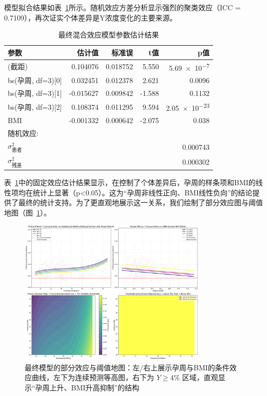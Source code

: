 \documentclass[withoutpreface]{cumcmthesis}
\begin{document}
模型拟合结果如表~\ref{tab:params}所示。随机效应方差分析显示强烈的聚类效应（ICC = \num{0.7109}），再次证实个体差异是Y浓度变化的主要来源。

\begin{table}[htbp]
  \centering
  \caption{最终混合效应模型参数估计结果}
  \label{tab:params}
  \begin{tabular}{@{}lrrrr@{}}
    \toprule
    参数 & 估计值 & 标准误 & t值 & p值 \\
    \midrule
    (截距) & 0.104076 & 0.018752 & 5.550 & \num{5.69e-7} \\
    bs(孕周, df=3)[0] & 0.032451 & 0.012378 & 2.621 & 0.0096 \\
    bs(孕周, df=3)[1] & -0.015627 & 0.009842 & -1.588 & 0.1132 \\
    bs(孕周, df=3)[2] & 0.108374 & 0.011295 & 9.594 & \num{2.05e-23} \\
    BMI & -0.001332 & 0.000642 & -2.075 & 0.038 \\
    \midrule
    \multicolumn{5}{l}{随机效应:}\\
    $\sigma^2_{\text{患者}}$ & \multicolumn{4}{r}{0.000743}\\
    $\sigma^2_{\text{残差}}$ & \multicolumn{4}{r}{0.000302}\\
    \bottomrule
  \end{tabular}
\end{table}

表~\ref{tab:params}中的固定效应估计结果显示，在控制了个体差异后，孕周的样条项和BMI的线性项均在统计上显著（p<0.05）。这为“孕周非线性正向、BMI线性负向”的结论提供了最终的统计支持。为了更直观地展示这一关系，我们绘制了部分效应图与阈值地图（图~\ref{fig:final_partial_effects}）。

\begin{figure}[htbp]
\centering
\includegraphics[width=0.8\textwidth]{output/figures/p1_comprehensive_partial_effects.png}
\caption{最终模型的部分效应与阈值地图：左/右上展示孕周与BMI的条件效应曲线，左下为连续预测等高图，右下为 $Y\ge4\%$ 区域，直观显示“孕周上升、BMI升高抑制”的结构}
\label{fig:final_partial_effects}
\end{figure}
\end{document}
